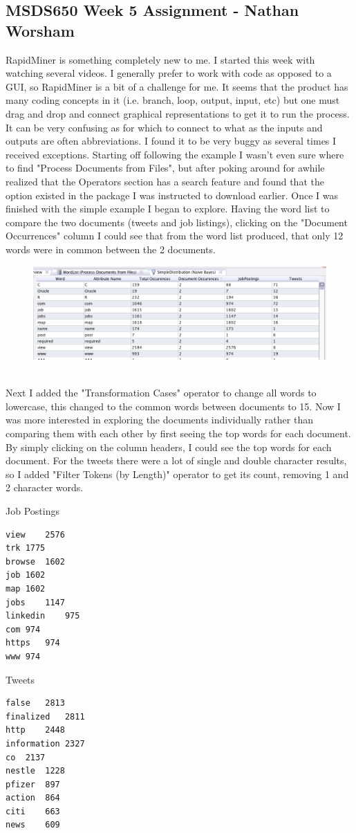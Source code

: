 \documentclass[10pt]{article}
\begin{document}
\subsection*{MSDS650 Week 5 Assignment - Nathan Worsham}
RapidMiner is something completely new to me. I started this week with watching several videos. I generally prefer to work with code as opposed to a GUI, so RapidMiner is a bit of a challenge for me. It seems that the product has many coding concepts in it (i.e. branch, loop, output, input, etc) but one must drag and drop and connect graphical representations to get it to run the process. It can be very confusing as for which to connect to what as the inputs and outputs are often abbreviations. I found it to be very buggy as several times I received exceptions. Starting off following the example I wasn't even sure where to find "Process Documents from Files", but after poking around for awhile realized that  the Operators section has a search feature and found that the option existed in the package I was instructed to download earlier. Once I was finished with the simple example I began to explore. Having the word list to compare the two documents (tweets and job listings), clicking on the "Document Occurrences" column I could see that from the word list produced, that only 12 words were in common between the 2 documents.
\begin{figure}[!h]
\includegraphics[scale=0.37]{wordlist_incommon.png}
\centering
\end{figure}\\
Next I added the "Transformation Cases" operator to change all words to lowercase, this changed to the common words between documents to 15. Now I was more interested in exploring the documents individually rather than comparing them with each other by first seeing the top words for each document. By simply clicking on the column headers, I could see the top words for each document. For the tweets there were a lot of single and double character results, so I added "Filter Tokens (by Length)" operator to get its count, removing 1 and 2 character words.
\begin{multicols}{2}
Job Postings
\begin{verbatim}
view	2576
trk	1775
browse	1602
job	1602
map	1602
jobs	1147
linkedin	975
com	974
https	974
www	974
\end{verbatim}
Tweets
\begin{verbatim}
false	2813
finalized	2811
http	2448
information	2327
co	2137
nestle	1228
pfizer	897
action	864
citi	663
news	609
\end{verbatim}
\end{multicols}
\end{document}
